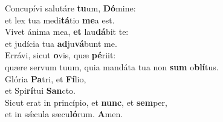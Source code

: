 \evenverse Concupívi salutáre \textbf{tu}um, \textbf{Dó}mine:~\*\\
\evenverse et lex tua medi\textbf{tá}tio \textbf{me}a est.\\
\oddverse Vivet ánima mea, \textbf{et} lau\textbf{dá}bit te:~\*\\
\oddverse et judícia tua \textbf{ad}ju\textbf{vá}bunt me.\\
\evenverse Errávi, sicut \textbf{o}vis, quæ \textbf{pé}riit:~\*\\
\evenverse quære servum tuum, quia mandáta tua non \textbf{sum} o\textbf{blí}tus.\\
\oddverse Glória \textbf{Pa}tri, et \textbf{Fí}lio,~\*\\
\oddverse et Spi\textbf{rí}tui \textbf{San}cto.\\
\evenverse Sicut erat in princípio, et \textbf{nunc}, et \textbf{sem}per,~\*\\
\evenverse et in sǽcula sæcu\textbf{ló}rum. \textbf{A}men.\\

